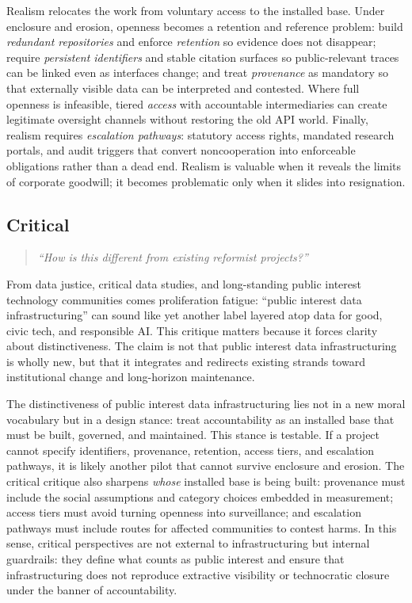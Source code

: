 \documentclass[acmsmall,screen]{acmart}
\begin{document}
Realism relocates the work from voluntary access to the installed base. Under enclosure and erosion, openness becomes a retention and reference problem: build \emph{redundant repositories} and enforce \emph{retention} so evidence does not disappear; require \emph{persistent identifiers} and stable citation surfaces so public-relevant traces can be linked even as interfaces change; and treat \emph{provenance} as mandatory so that externally visible data can be interpreted and contested. Where full openness is infeasible, tiered \emph{access} with accountable intermediaries can create legitimate oversight channels without restoring the old API world. Finally, realism requires \emph{escalation pathways}: statutory access rights, mandated research portals, and audit triggers that convert noncooperation into enforceable obligations rather than a dead end. Realism is valuable when it reveals the limits of corporate goodwill; it becomes problematic only when it slides into resignation.

\subsection*{Critical}
\begin{quote}\centering
\textit{``How is this different from existing reformist projects?''}
\end{quote}

\noindent From data justice, critical data studies, and long-standing public interest technology communities comes proliferation fatigue: ``public interest data infrastructuring'' can sound like yet another label layered atop data for good, civic tech, and responsible AI. This critique matters because it forces clarity about distinctiveness. The claim is not that public interest data infrastructuring is wholly new, but that it integrates and redirects existing strands toward institutional change and long-horizon maintenance.

The distinctiveness of public interest data infrastructuring lies not in a new moral vocabulary but in a design stance: treat accountability as an installed base that must be built, governed, and maintained. This stance is testable. If a project cannot specify identifiers, provenance, retention, access tiers, and escalation pathways, it is likely another pilot that cannot survive enclosure and erosion. The critical critique also sharpens \emph{whose} installed base is being built: provenance must include the social assumptions and category choices embedded in measurement; access tiers must avoid turning openness into surveillance; and escalation pathways must include routes for affected communities to contest harms. In this sense, critical perspectives are not external to infrastructuring but internal guardrails: they define what counts as public interest and ensure that infrastructuring does not reproduce extractive visibility or technocratic closure under the banner of accountability.
\end{document}
